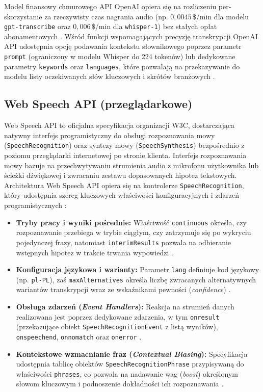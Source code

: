 Model finansowy chmurowego API OpenAI opiera się na rozliczeniu per-skorzystanie za rzeczywisty czas nagrania audio (np. $0{,}0045$\,\$/min dla modelu \texttt{gpt-transcribe} oraz $0{,}006$\,\$/min dla \texttt{whisper-1}) bez stałych opłat abonamentowych \cite{openai_pricing}. Wśród funkcji wspomagających precyzję transkrypcji OpenAI API udostępnia opcję podawania kontekstu słownikowego poprzez parametr \texttt{prompt} (ograniczony w modelu Whisper do 224 tokenów) lub dedykowane parametry \texttt{keywords} oraz \texttt{languages}, które pozwalają na przekazywanie do modelu listy oczekiwanych słów kluczowych i skrótów branżowych \cite{openai_file_transcription}.

\subsection{Web Speech API (przeglądarkowe)}
Web Speech API to oficjalna specyfikacja organizacji W3C, dostarczająca natywny interfejs programistyczny do obsługi rozpoznawania mowy (\texttt{SpeechRecognition}) oraz syntezy mowy (\texttt{SpeechSynthesis}) bezpośrednio z poziomu przeglądarki internetowej po stronie klienta. Interfejs rozpoznawania mowy bazuje na przechwytywaniu strumienia audio z mikrofonu użytkownika lub ścieżki dźwiękowej i zwracaniu zestawu dopasowanych hipotez tekstowych. Architektura Web Speech API opiera się na kontrolerze \texttt{SpeechRecognition}, który udostępnia szereg kluczowych właściwości konfiguracyjnych i zdarzeń programistycznych \cite{mdnWebSpeechAPI}:
\begin{itemize}
    \item \textbf{Tryby pracy i wyniki pośrednie:} Właściwość \texttt{continuous} określa, czy rozpoznawanie przebiega w trybie ciągłym, czy zatrzymuje się po wykryciu pojedynczej frazy, natomiast \texttt{interimResults} pozwala na odbieranie wstępnych hipotez w trakcie trwania wypowiedzi \cite{mdnWebSpeechAPI}.
    \item \textbf{Konfiguracja językowa i warianty:} Parametr \texttt{lang} definiuje kod językowy (np. \texttt{pl-PL}), zaś \texttt{maxAlternatives} określa liczbę zwracanych alternatywnych wariantów transkrypcji wraz ze wskaźnikami pewności (\textit{confidence}) \cite{mdnWebSpeechAPI}.
    \item \textbf{Obsługa zdarzeń (\textit{Event Handlers}):} Reakcja na strumień danych realizowana jest poprzez dedykowane zdarzenia, w tym \texttt{onresult} (przekazujące obiekt \texttt{Speech\-Recognition\-Event} z listą wyników), \texttt{onspeechend}, \texttt{onnomatch} oraz \texttt{onerror} \cite{mdnWebSpeechAPI}.
    \item \textbf{Kontekstowe wzmacnianie fraz (\textit{Contextual Biasing}):} Specyfikacja udostępnia tablicę obiektów \texttt{Speech\-Recognition\-Phrase} przypisywaną do właściwości \texttt{phrases}, co pozwala na nadawanie wag (\textit{boost}) określonym słowom kluczowym i podnoszenie dokładności ich rozpoznawania \cite{mdnWebSpeechAPI}.
\end{itemize}
